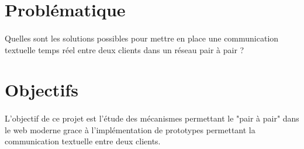 \section{Problématique}

\paragraph{}
Quelles sont les solutions possibles pour mettre en place une communication textuelle temps réel entre deux clients dans un réseau pair à pair ?

\section{Objectifs}

\paragraph{}
L'objectif de ce projet est l'étude des mécanismes permettant le "pair à pair" dans le web moderne grace à l'implémentation de prototypes permettant la communication textuelle entre deux clients.
